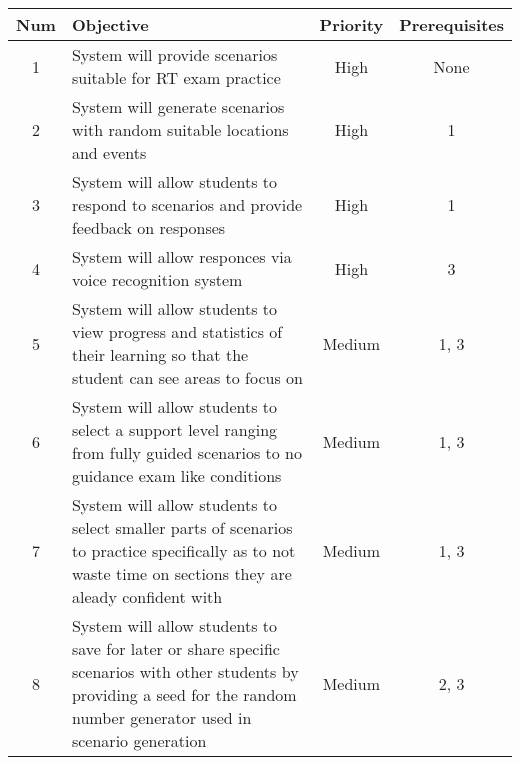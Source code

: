 \begin{center}
    \begin{tabular}{ | c | m{5em} | c | c | }
        \hline
        Num & Objective & Priority & Prerequisites \\
        \hline
        1 & System will provide scenarios suitable for RT exam practice & High & None \\
        \hline
        2 & System will generate scenarios with random suitable locations and events & High & 1 \\
        \hline
        3 & System will allow students to respond to scenarios and provide feedback on responses & High & 1 \\
        \hline
        4 & System will allow responces via voice recognition system & High & 3 \\
        \hline
        5 & System will allow students to view progress and statistics of their learning so that the student can see areas to focus on & Medium & 1, 3 \\
        \hline
        6 & System will allow students to select a support level ranging from fully guided scenarios to no guidance exam like conditions & Medium & 1, 3 \\
        \hline
        7 & System will allow students to select smaller parts of scenarios to practice specifically as to not waste time on sections they are aleady confident with & Medium & 1, 3 \\
        \hline
        8 & System will allow students to save for later or share specific scenarios with other students by providing a seed for the random number generator used in scenario generation & Medium & 2, 3 \\
        \hline
    \end{tabular}
\end{center}